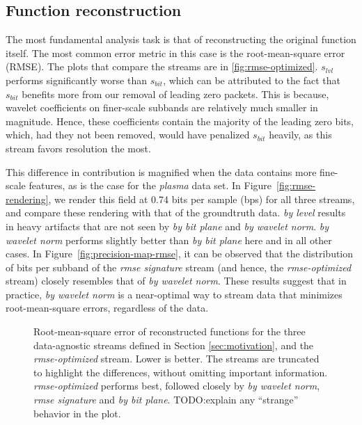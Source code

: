 \subsection{Function reconstruction}\label{sec:rmse-optimized}

The most fundamental analysis task is that of reconstructing the original function itself. The most
common error metric in this case is the root-mean-square error (RMSE). The plots that compare the
streams are in \autoref{fig:rmse-optimized}. $s_{lvl}$ performs significantly worse than $s_{bit}$,
which can be attributed to the fact that $s_{bit}$ benefits more from our removal of leading zero
packets. This is because, wavelet coefficients on finer-scale subbands are relatively much smaller
in magnitude. Hence, these coefficients contain the majority of the leading zero bits, which, had
they not been removed, would have penalized $s_{bit}$ heavily, as this stream favors resolution the
most.

This difference in contribution is magnified when the data contains more fine-scale features, as is
the case for the \emph{plasma} data set. In Figure~\ref{fig:rmse-rendering}, we render this field at
0.74 bits per sample (bps) for all three streams, and compare these rendering with that of the
groundtruth data. \emph{by level} results in heavy artifacts that are not seen by \emph{by bit
plane} and \emph{by wavelet norm}. \emph{by wavelet norm} performs slightly better than \emph{by bit
plane} here and in all other cases. In Figure~\ref{fig:precision-map-rmse}, it can be observed that
the distribution of bits per subband of the \emph{rmse signature} stream (and hence, the
\emph{rmse-optimized} stream) closely resembles that of \emph{by wavelet norm}. These results
suggest that in practice, \emph{by wavelet norm} is a near-optimal way to stream data that minimizes
root-mean-square errors, regardless of the data.

\begin{figure}[h]
  \centering
  \caption{Root-mean-square error of reconstructed functions for the three data-agnostic streams
  defined in Section \ref{sec:motivation}, and the \emph{rmse-optimized} stream. Lower is better.
  The streams are truncated to highlight the differences, without omitting important information.
  \emph{rmse-optimized} performs best, followed closely by \emph{by wavelet norm}, \emph{rmse
  signature} and \emph{by bit plane}. TODO:explain any ``strange'' behavior in the
  plot.}\label{fig:rmse-optimized}
\end{figure}

